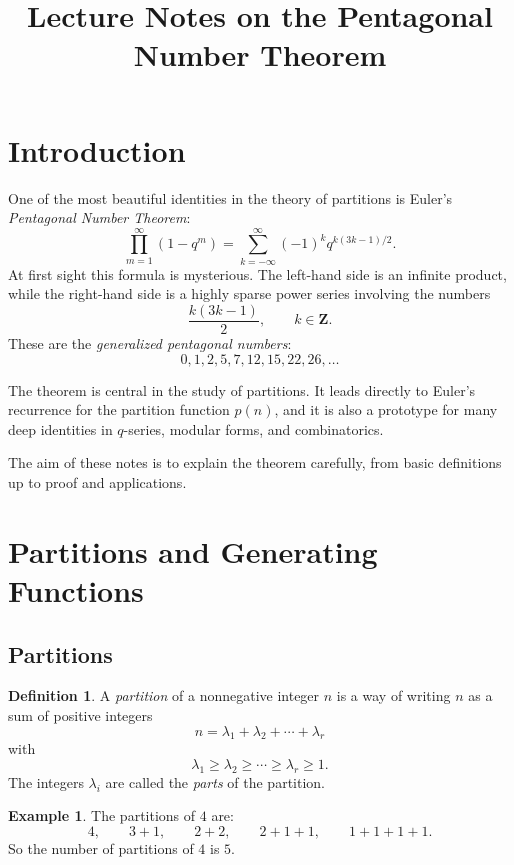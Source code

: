 \documentclass[11pt]{article}
\title{Lecture Notes on the Pentagonal Number Theorem}
\author{}
\date{}
\theoremstyle{definition}
\newtheorem{definition}[theorem]{Definition}
\newtheorem{example}[theorem]{Example}
\theoremstyle{remark}
\newcommand{\ZZ}{\mathbf{Z}}
\begin{document}
	
	\maketitle
	
	\tableofcontents
	
	\section{Introduction}
	
	One of the most beautiful identities in the theory of partitions is Euler's \emph{Pentagonal Number Theorem}:
	\[
	\prod_{m=1}^{\infty}(1-q^m)
	=
	\sum_{k=-\infty}^{\infty}(-1)^k q^{k(3k-1)/2}.
	\]
	At first sight this formula is mysterious. The left-hand side is an infinite product, while the right-hand side is a highly sparse power series involving the numbers
	\[
	\frac{k(3k-1)}{2},
	\qquad k\in \ZZ.
	\]
	These are the \emph{generalized pentagonal numbers}:
	\[
	0,1,2,5,7,12,15,22,26,\dots
	\]
	
	The theorem is central in the study of partitions. It leads directly to Euler's recurrence for the partition function \(p(n)\), and it is also a prototype for many deep identities in \(q\)-series, modular forms, and combinatorics.
	
	The aim of these notes is to explain the theorem carefully, from basic definitions up to proof and applications.
	
	\section{Partitions and Generating Functions}
	
	\subsection{Partitions}
	
	\begin{definition}
		A \emph{partition} of a nonnegative integer \(n\) is a way of writing \(n\) as a sum of positive integers
		\[
		n=\lambda_1+\lambda_2+\cdots+\lambda_r
		\]
		with
		\[
		\lambda_1\ge \lambda_2\ge \cdots \ge \lambda_r\ge 1.
		\]
		The integers \(\lambda_i\) are called the \emph{parts} of the partition.
	\end{definition}
	
	\begin{example}
		The partitions of \(4\) are:
		\[
		4,\qquad 3+1,\qquad 2+2,\qquad 2+1+1,\qquad 1+1+1+1.
		\]
		So the number of partitions of \(4\) is \(5\).
	\end{example}
	
\end{document}
